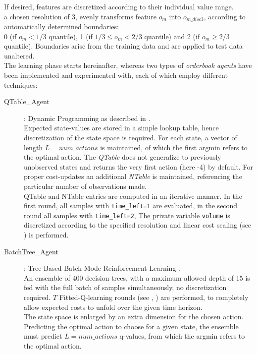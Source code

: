 If desired, features are discretized according to their individual value range.\\
\Eg a chosen resolution of 3, evenly transforms feature $o_m$ into $o_{m\_disc3}$, according to automatically determined boundaries: \\
0 (if $o_m< 1/3$ quantile), 1 (if $1/3 \leq o_m < 2/3$ quantile) and 2 (if $o_m \geq 2/3$ quantile). Boundaries arise from the training data and are applied to test data unaltered.\\

The learning phase starts hereinafter, whereas two types of \emph{orderbook agents} have been implemented and experimented with, each of which employ different techniques:

\begin{description}
\item[QTable\_Agent] : Dynamic Programming as described in .\\
Expected state-values are stored in a simple lookup table, hence discretization of the state space is required. For each state, a vector of length $L=num\_actions$ is maintained, of which the first argmin refers to the optimal action. The \emph{QTable} does not generalize to previously unobserved states and returns the very first action (here -4) by default. For proper cost-updates an additional \emph{NTable} is maintained, referencing the particular number of observations made.\\
QTable and NTable entries are computed in an iterative manner. In the first round, all samples with \lstinline!time_left=1! are evaluated, in the second round all samples with \lstinline!time_left=2!, \etc The private variable \lstinline!volume! is discretized according to the specified resolution and linear cost scaling (see ) is performed.

\item[BatchTree\_Agent]: Tree-Based Batch Mode Reinforcement Learning \Cite{Ernst:2005:TreeBasedBatchModeRL}.\\
An ensemble of 400 decision trees, with a maximum allowed depth of 15 is fed with the full batch of samples simultaneously, no discretization required. $T$ Fitted-Q-learning rounds (see , ) are performed, to completely allow expected costs to unfold over the given time horizon.\\
The state space is enlarged by an extra dimension for the chosen action. Predicting the optimal action to choose for a given state, the ensemble must predict $L=num\_actions$ q-values, from which the argmin refers to the optimal action.
\end{description}\bigskip

